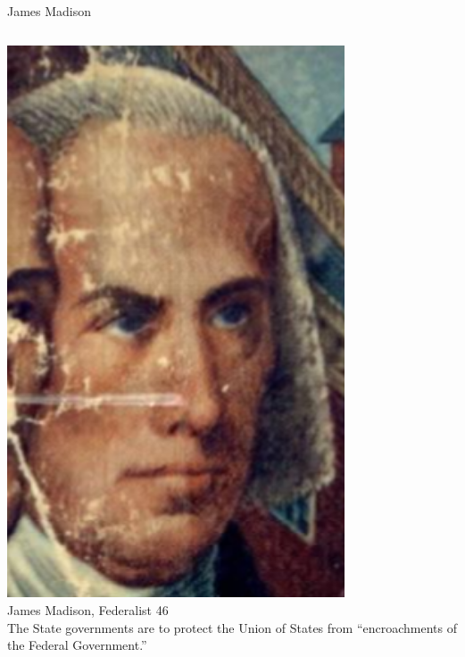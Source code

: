 
%

\begin{frame}{James Madison}
    \begin{columns}[onlytextwidth]
            \centering
            \includegraphics[width=0.75\textwidth]{img/madison-2.png} \\
            James Madison, Federalist 46 \\
            The State governments are to protect the Union of States from ``encroachments of the Federal Government.''
    \end{columns}
\end{frame}

